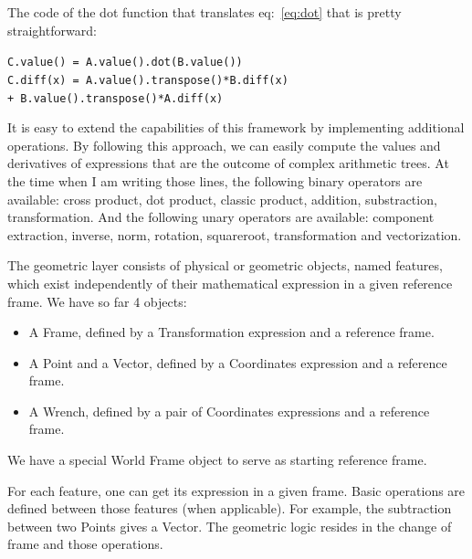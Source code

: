 
The code of the dot function that translates eq:~\ref{eq:dot} that is pretty straightforward:
\begin{center}
{\tt C.value() = A.value().dot(B.value())\\
C.diff(x) = A.value().transpose()*B.diff(x) \\ + B.value().transpose()*A.diff(x)}
\end{center}

It is easy to extend the capabilities of this framework by implementing additional operations.
By following this approach, we can easily compute the values and derivatives of expressions that are the outcome of complex arithmetic trees.
At the time when I am writing those lines, the following binary operators are available: cross product, dot product, classic product, addition, substraction, transformation.
And the following unary operators are available: component extraction, inverse, norm, rotation, squareroot, transformation and vectorization.

The geometric layer consists of physical or geometric objects, named features, which exist independently of their mathematical expression in a given reference frame.
We have so far 4 objects:
\begin{itemize}
  \item A Frame, defined by a Transformation expression and a reference frame.
  \item A Point and a Vector, defined by a Coordinates expression and a reference frame.
  \item A Wrench, defined by a pair of Coordinates expressions and a reference frame.
\end{itemize}
We have a special World Frame object to serve as starting reference frame.

For each feature, one can get its expression in a given frame.
Basic operations are defined between those features (when applicable).
For example, the subtraction between two Points gives a Vector.
The geometric logic resides in the change of frame and those operations.

